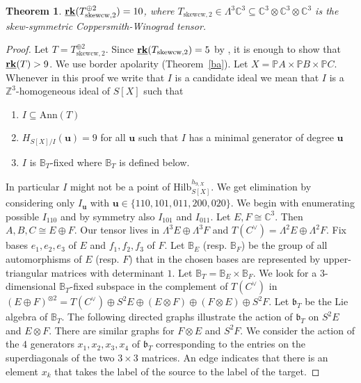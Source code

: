 \documentclass[12pt]{amsart}
\newtheorem{theorem}{Theorem}[section]
\theoremstyle{definition}
\theoremstyle{remark}
\theoremstyle{definition}
\newcommand{\brk}{{\underline{{\bf rk}}}}
\newcommand{\HF}[2]{H_{#1}(#2)}
\newcommand{\CC}{\mathbb{C}}
\newcommand{\PP}{\mathbb{P}}
\newcommand{\Ann}{\mathrm{Ann}}
\newcommand{\Hilb}{\mathrm{Hilb}}
\begin{document}
\begin{theorem}\label{thm:skew}
$\brk(T_{\mathrm{skewcw},2}^{\oplus 2}) = 10$, where $T_{\mathrm{skewcw},{2}}\in \Lambda^3 \CC^3 \subseteq \CC^3\otimes \CC^3\otimes \CC^3$ is the skew-symmetric Coppersmith-Winograd tensor. 
\end{theorem}
\begin{proof}
Let $T =  T_{\mathrm{skewcw},2}^{\oplus 2}$.  
    Since $\brk(T_{\mathrm{skewcw},2})= 5$ by \cite[Proposition~3.2]{CGLV22}, it is enough to show that $\brk(T) > 9$. We use border apolarity (Theorem~\ref{ba}). Let $X = \PP A\times \PP B\times \PP C$.
    Whenever in this proof we write that $I$ is a candidate ideal we mean that $I$ is a $\mathbb{Z}^3$-homogeneous ideal of $S[X]$ such that 
    \begin{enumerate}
        \item $I\subseteq \Ann(T)$
        \item $\HF{S[X]/I}{\mathbf{u}} = 9$ for all $\mathbf{u}$ such that $I$ has a minimal generator of degree $\mathbf{u}$ 
        \item $I$ is $\mathbb{B}_T$-fixed where $\mathbb{B}_T$ is defined below.
    \end{enumerate}
    In particular $I$ might not be a point of $\Hilb_{S[X]}^{h_{9,X}}$. We get elimination by considering only $I_{\mathbf{u}}$ with $\mathbf{u}\in \{110,101,011,200,020\}$. We begin with enumerating possible $I_{110}$ and by symmetry also $I_{101}$ and $I_{011}$.
    Let $E,F\cong \mathbb{C}^3$. Then $A,B,C\cong E\oplus F$. Our tensor lives in $\Lambda^3E \oplus \Lambda^3 F$ and $T(C^\vee) = \Lambda^2 E \oplus \Lambda^2 F$.
    Fix bases $e_1, e_2, e_3$ of $E$ and $f_1, f_2, f_3$ of $F$. Let $\mathbb{B}_E$ (resp. $\mathbb{B}_F$) be the group of all automorphisms of $E$ (resp. $F$) that in the chosen bases are represented by upper-triangular matrices with determinant $1$. Let $\mathbb{B}_T = \mathbb{B}_E\times \mathbb{B}_F$. We look for a $3$-dimensional $\mathbb{B}_T$-fixed subspace in the complement of $T(C^\vee)$ in $(E\oplus F)^{\otimes 2} = T(C^\vee) \oplus S^2E \oplus (E\otimes F) \oplus (F\otimes E) \oplus S^2F$. Let $\mathfrak{b}_T$ be the Lie algebra of $\mathbb{B}_T$. The following directed graphs illustrate the action of $\mathfrak{b}_T$ on $S^2E$ and $E\otimes F$. There are similar graphs for $F\otimes E$ and $S^2F$. We consider the action of the $4$ generators $x_1,x_2,x_3,x_4$ of $\mathfrak{b}_T$ corresponding to the entries on the superdiagonals of the two $3\times 3$ matrices. An edge indicates that there is an element $x_k$ that takes the label of the source to the label of the target. 


\end{proof}
\end{document}
